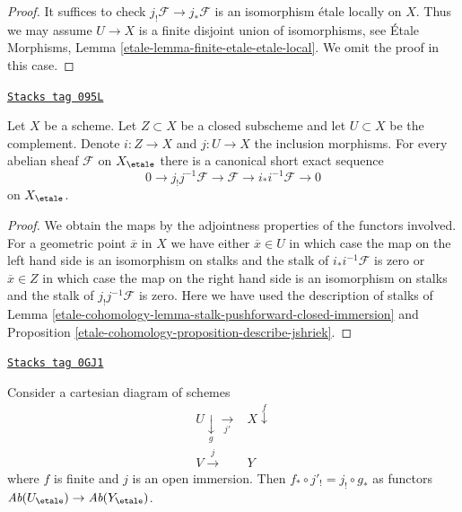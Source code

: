 \begin{proof}
It suffices to check $j_!\mathcal{F} \to j_*\mathcal{F}$
is an isomorphism \'etale locally on $X$.
Thus we may assume $U \to X$ is a finite disjoint union
of isomorphisms, see
\'Etale Morphisms, Lemma \ref{etale-lemma-finite-etale-etale-local}.
We omit the proof in this case.
\end{proof}

\begin{lemma}
\label{etale-cohomology-lemma-ses-associated-to-open}
\href{https://stacks.math.columbia.edu/tag/095L}{\texttt{Stacks tag 095L}}

Let $X$ be a scheme. Let $Z \subset X$ be a closed subscheme and let
$U \subset X$ be the complement. Denote $i : Z \to X$ and $j : U \to X$
the inclusion morphisms. For every abelian sheaf $\mathcal{F}$ on $X_\etale$
there is a canonical short exact sequence
$$
0 \to j_!j^{-1}\mathcal{F} \to \mathcal{F} \to i_*i^{-1}\mathcal{F} \to 0
$$
on $X_\etale$.
\end{lemma}

\begin{proof}
We obtain the maps by the adjointness properties of the functors
involved. For a geometric point $\overline{x}$ in $X$ we have either
$\overline{x} \in U$ in which case the map on the left hand side
is an isomorphism on stalks and the stalk of $i_*i^{-1}\mathcal{F}$
is zero or $\overline{x} \in Z$ in which case the map on the right hand side
is an isomorphism on stalks and the stalk of $j_!j^{-1}\mathcal{F}$
is zero. Here we have used the description of stalks of
Lemma \ref{etale-cohomology-lemma-stalk-pushforward-closed-immersion} and
Proposition \ref{etale-cohomology-proposition-describe-jshriek}.
\end{proof}

\begin{lemma}
\label{etale-cohomology-lemma-compatible-shriek-push-finite}
\href{https://stacks.math.columbia.edu/tag/0GJ1}{\texttt{Stacks tag 0GJ1}}

Consider a cartesian diagram of schemes
$$
\begin{array}{cc}U \underset{g}{\downarrow}\underset{j'}{\longrightarrow} & X \overset{f}{\downarrow} \\ V \overset{j}{\longrightarrow} & Y\end{array}
$$
where $f$ is finite and $j$ is an open immersion.
Then $f_* \circ j'_! = j_! \circ g_*$ as functors
$\textit{Ab}(U_\etale) \to \textit{Ab}(Y_\etale)$.
\end{lemma}

